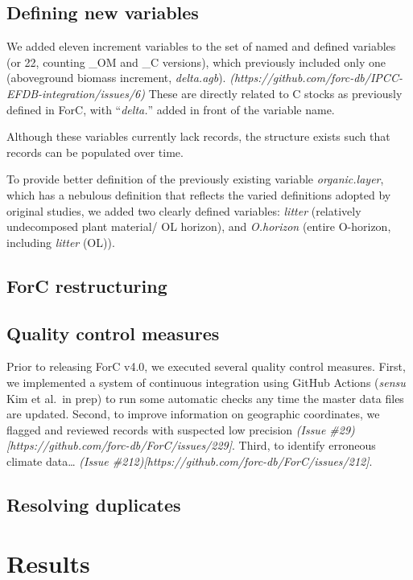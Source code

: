 \documentclass[, manuscript]{copernicus}
\begin{document}
\subsection{Defining new variables}

We added eleven increment variables to the set of named and defined
variables (or 22, counting \_OM and \_C versions), which previously
included only one (aboveground biomass increment, \emph{delta.agb}).
\emph{(https://github.com/forc-db/IPCC-EFDB-integration/issues/6)} These
are directly related to C stocks as previously defined in ForC, with
``\emph{delta.}'' added in front of the variable name.

Although these variables currently lack records, the structure exists
such that records can be populated over time.

To provide better definition of the previously existing variable
\emph{organic.layer}, which has a nebulous definition that reflects the
varied definitions adopted by original studies, we added two clearly
defined variables: \emph{litter} (relatively undecomposed plant
material/ OL horizon), and \emph{O.horizon} (entire O-horizon, including
\emph{litter} (OL)).

\subsection{ForC restructuring}

\subsection{Quality control measures}

Prior to releasing ForC v4.0, we executed several quality control
measures. First, we implemented a system of continuous integration using
GitHub Actions (\emph{sensu} Kim et al.~in prep) to run some automatic
checks any time the master data files are updated. Second, to improve
information on geographic coordinates, we flagged and reviewed records
with suspected low precision \emph{(Issue
\#29){[}https://github.com/forc-db/ForC/issues/229{]}}. Third, to
identify erroneous climate data\ldots{} \emph{(Issue
\#212){[}https://github.com/forc-db/ForC/issues/212{]}}.

\subsection{Resolving duplicates}

\section{Results}
\end{document}
